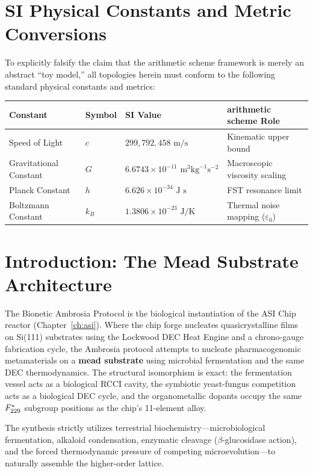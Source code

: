 \section*{SI Physical Constants and Metric Conversions}
To explicitly falsify the claim that the arithmetic scheme framework is merely an abstract ``toy model,'' all topologies herein must conform to the following standard physical constants and metrics:
\begin{table}[ht]
\centering
\renewcommand{\arraystretch}{1.2}
\begin{tabular}{@{}llll@{}}
\toprule
\textbf{Constant} & \textbf{Symbol} & \textbf{SI Value} & \textbf{arithmetic scheme Role} \\
\midrule
Speed of Light & $c$ & $299,792,458 \text{ m/s}$ & Kinematic upper bound \\
Gravitational Constant & $G$ & $6.6743 \times 10^{-11} \text{ m}^3 \text{kg}^{-1} \text{s}^{-2}$ & Macroscopic viscosity scaling \\
Planck Constant & $h$ & $6.626 \times 10^{-34} \text{ J s}$ & FST resonance limit \\
Boltzmann Constant & $k_B$ & $1.3806 \times 10^{-23} \text{ J/K}$ & Thermal noise mapping ($\varepsilon_0$) \\
\bottomrule
\end{tabular}
\end{table}

\section{Introduction: The Mead Substrate Architecture}
The Bionetic Ambrosia Protocol is the biological instantiation of the ASI Chip reactor (Chapter~\ref{ch:asi}). Where the chip forge nucleates quasicrystalline films on Si(111) substrates using the Lockwood DEC Heat Engine and a chrono-gauge fabrication cycle, the Ambrosia protocol attempts to nucleate pharmacogenomic metamaterials on a \textbf{mead substrate} using microbial fermentation and the same DEC thermodynamics. The structural isomorphism is exact: the fermentation vessel acts as a biological RCCI cavity, the symbiotic yeast-fungus competition acts as a biological DEC cycle, and the organometallic dopants occupy the same $F_{229}^*$ subgroup positions as the chip's 11-element alloy.

The synthesis strictly utilizes terrestrial biochemistry---microbiological fermentation, alkaloid condensation, enzymatic cleavage ($\beta$-glucosidase action), and the forced thermodynamic pressure of competing microevolution---to naturally assemble the higher-order lattice.

